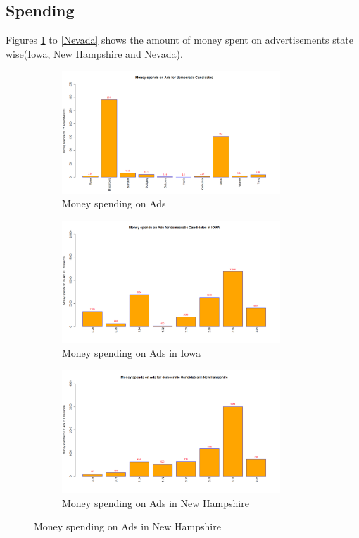 \subsection{Spending}
Figures \ref{MoneyspendinAds} to \ref{Nevada} shows the amount of money spent on advertisements state wise(Iowa, New Hampshire and Nevada). 
\begin{figure}[H]

\begin{figure}[H]
    \centering
    \includegraphics[width=0.9\textwidth]{figures/MoneyspendinAds.png}
    \caption{Money spending on Ads}
    \label{MoneyspendinAds}
\end{figure}

\begin{figure}[H]
    \centering
    \includegraphics[width=0.9\textwidth]{figures/IOWA.png}
    \caption{Money spending on Ads in Iowa}
    \label{IOWA}
\end{figure}

\begin{figure}[H]
    \centering
    \includegraphics[width=0.9\textwidth]{figures/Newhampshire.png}
    \caption{Money spending on Ads in New Hampshire}
    \label{Newhampshire}
\end{figure}


\end{figure}
